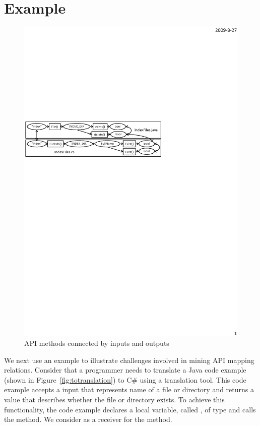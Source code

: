 \section{Example}
\label{sec:example}

\begin{figure}[t]
\centering
\includegraphics[scale=0.8,clip]{figure/dataflow.eps}\vspace*{-3ex}
 \caption
{\label{fig:dataflow}API methods connected by inputs and
outputs}\vspace*{-3ex}
\end{figure}

We next use an example to illustrate challenges involved in
mining API mapping relations. Consider that a programmer needs to translate
a Java code example (shown in Figure~\ref{fig:totranslation}) to C\# using a translation tool.
This code example accepts a  input that represents
name of a file or directory and returns a  value that
describes whether the file or directory exists. To achieve this functionality,
the code example declares a local variable, called ,
of type  and calls the  method.
We consider  as a receiver for the  method.

